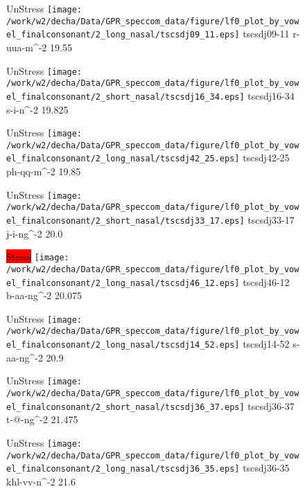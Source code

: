 \documentclass{article}
\begin{document}
\begin{figure}[t]
\begin{minipage}[b]{.24\textwidth}
UnStress
\centering
\texttt{[image: /work/w2/decha/Data/GPR\_speccom\_data/figure/lf0\_plot\_by\_vowel\_finalconsonant/2\_long\_nasal/tscsdj09\_11.eps]}
tscsdj09-11 r-uua-m\textasciicircum-2 19.55
\end{minipage}
\begin{minipage}[b]{.24\textwidth}
UnStress
\centering
\texttt{[image: /work/w2/decha/Data/GPR\_speccom\_data/figure/lf0\_plot\_by\_vowel\_finalconsonant/2\_short\_nasal/tscsdj16\_34.eps]}
tscsdj16-34 s-i-n\textasciicircum-2 19.825
\end{minipage}
\begin{minipage}[b]{.24\textwidth}
UnStress
\centering
\texttt{[image: /work/w2/decha/Data/GPR\_speccom\_data/figure/lf0\_plot\_by\_vowel\_finalconsonant/2\_long\_nasal/tscsdj42\_25.eps]}
tscsdj42-25 ph-qq-m\textasciicircum-2 19.85
\end{minipage}
\begin{minipage}[b]{.24\textwidth}
UnStress
\centering
\texttt{[image: /work/w2/decha/Data/GPR\_speccom\_data/figure/lf0\_plot\_by\_vowel\_finalconsonant/2\_short\_nasal/tscsdj33\_17.eps]}
tscsdj33-17 j-i-ng\textasciicircum-2 20.0
\end{minipage}
\end{figure}

\begin{figure}[t]
\begin{minipage}[b]{.24\textwidth}
\colorbox{red}{Stress}
\centering
\texttt{[image: /work/w2/decha/Data/GPR\_speccom\_data/figure/lf0\_plot\_by\_vowel\_finalconsonant/2\_long\_nasal/tscsdj46\_12.eps]}
tscsdj46-12 b-aa-ng\textasciicircum-2 20.075
\end{minipage}
\begin{minipage}[b]{.24\textwidth}
UnStress
\centering
\texttt{[image: /work/w2/decha/Data/GPR\_speccom\_data/figure/lf0\_plot\_by\_vowel\_finalconsonant/2\_long\_nasal/tscsdj14\_52.eps]}
tscsdj14-52 s-aa-ng\textasciicircum-2 20.9
\end{minipage}
\begin{minipage}[b]{.24\textwidth}
UnStress
\centering
\texttt{[image: /work/w2/decha/Data/GPR\_speccom\_data/figure/lf0\_plot\_by\_vowel\_finalconsonant/2\_short\_nasal/tscsdj36\_37.eps]}
tscsdj36-37 t-@-ng\textasciicircum-2 21.475
\end{minipage}
\begin{minipage}[b]{.24\textwidth}
UnStress
\centering
\texttt{[image: /work/w2/decha/Data/GPR\_speccom\_data/figure/lf0\_plot\_by\_vowel\_finalconsonant/2\_long\_nasal/tscsdj36\_35.eps]}
tscsdj36-35 khl-vv-n\textasciicircum-2 21.6
\end{minipage}
\end{figure}
\end{document}
